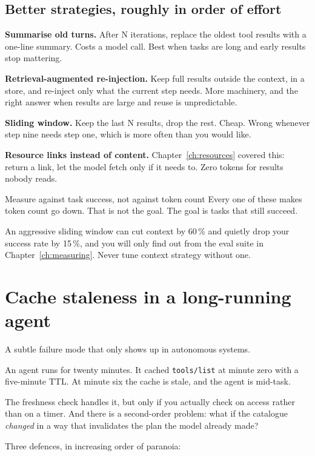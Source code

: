 \subsection{Better strategies, roughly in order of effort}

\textbf{Summarise old turns.} After N iterations, replace the oldest tool results
with a one-line summary. Costs a model call. Best when tasks are long and early
results stop mattering.

\textbf{Retrieval-augmented re-injection.} Keep full results outside the context,
in a store, and re-inject only what the current step needs. More machinery, and
the right answer when results are large and reuse is unpredictable.

\textbf{Sliding window.} Keep the last N results, drop the rest. Cheap. Wrong
whenever step nine needs step one, which is more often than you would like.

\textbf{Resource links instead of content.} Chapter~\ref{ch:resources} covered
this: return a link, let the model fetch only if it needs to. Zero tokens for
results nobody reads.

\begin{notebox}{Measure against task success, not against token count}
Every one of these makes token count go down. That is not the goal. The goal is
tasks that still succeed.

An aggressive sliding window can cut context by 60\,\% and quietly drop your
success rate by 15\,\%, and you will only find out from the eval suite in
Chapter~\ref{ch:measuring}. Never tune context strategy without one.
\end{notebox}

\section{Cache staleness in a long-running agent}

A subtle failure mode that only shows up in autonomous systems.

An agent runs for twenty minutes. It cached \texttt{tools/list} at minute zero
with a five-minute TTL. At minute six the cache is stale, and the agent is
mid-task.

The freshness check handles it, but only if you actually check on access rather
than on a timer. And there is a second-order problem: what if the catalogue
\emph{changed} in a way that invalidates the plan the model already made?

Three defences, in increasing order of paranoia:

